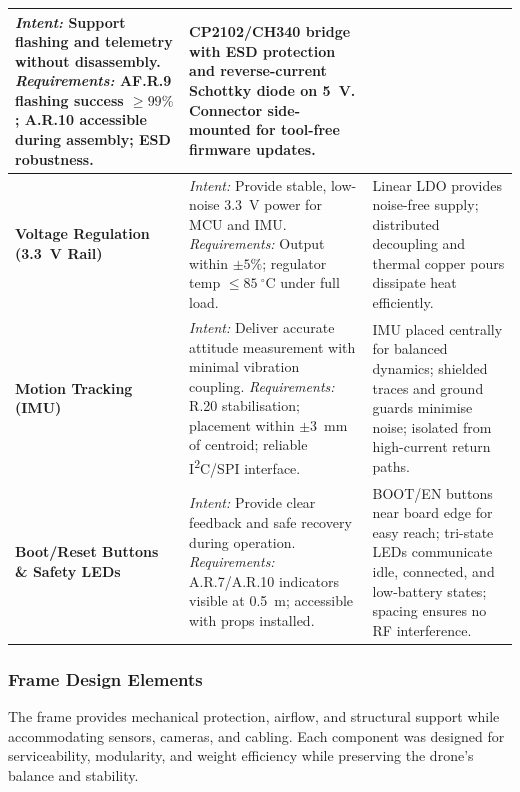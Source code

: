 \begin{longtable}{@{}p{2cm} p{6.9cm} p{6.9cm}@{}}
\textit{Intent:} Support flashing and telemetry without disassembly. \newline
\textit{Requirements:} AF.R.9 flashing success $\geq 99\%$; A.R.10 accessible during assembly; ESD robustness. &
CP2102/CH340 bridge with ESD protection and reverse-current Schottky diode on 5~V. Connector side-mounted for tool-free firmware updates. \\ 
\midrule
\textbf{Voltage Regulation (3.3~V Rail)} &
\textit{Intent:} Provide stable, low-noise 3.3~V power for MCU and IMU. \newline
\textit{Requirements:} Output within $\pm5\%$; regulator temp $\leq 85~^{\circ}$C under full load. &
Linear LDO provides noise-free supply; distributed decoupling and thermal copper pours dissipate heat efficiently. \\ 
\midrule
\textbf{Motion Tracking (IMU)} &
\textit{Intent:} Deliver accurate attitude measurement with minimal vibration coupling. \newline
\textit{Requirements:} R.20 stabilisation; placement within $\pm3$~mm of centroid; reliable I\textsuperscript{2}C/SPI interface. &
IMU placed centrally for balanced dynamics; shielded traces and ground guards minimise noise; isolated from high-current return paths. \\ 
\midrule
\textbf{Boot/Reset Buttons \& Safety LEDs} &
\textit{Intent:} Provide clear feedback and safe recovery during operation. \newline
\textit{Requirements:} A.R.7/A.R.10 indicators visible at 0.5~m; accessible with props installed. &
BOOT/EN buttons near board edge for easy reach; tri-state LEDs communicate idle, connected, and low-battery states; spacing ensures no RF interference. \\ 
\bottomrule
\end{longtable}

\subsubsection{Frame Design Elements}

The frame provides mechanical protection, airflow, and structural support while accommodating sensors, cameras, and cabling. Each component was designed for serviceability, modularity, and weight efficiency while preserving the drone’s balance and stability.


